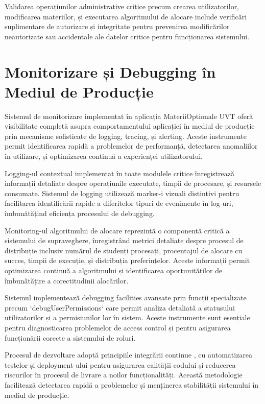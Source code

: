 \documentclass[12pt,a4paper]{report}
\begin{document}
Validarea operațiunilor administrative critice precum crearea utilizatorilor, modificarea materiilor, și executarea algoritmului de alocare include verificări suplimentare de autorizare și integritate pentru prevenirea modificărilor neautorizate sau accidentale ale datelor critice pentru funcționarea sistemului.

\section{Monitorizare și Debugging în Mediul de Producție}

Sistemul de monitorizare implementat în aplicația MateriiOptionale UVT oferă visibilitate completă asupra comportamentului aplicației în mediul de producție prin mecanisme sofisticate de logging, tracing, și alerting. Aceste instrumente permit identificarea rapidă a problemelor de performanță, detectarea anomaliilor în utilizare, și optimizarea continuă a experienței utilizatorului.

Logging-ul contextual implementat în toate modulele critice înregistrează informații detaliate despre operațiunile executate, timpii de procesare, și resursele consumate. Sistemul de logging utilizează marker-i vizuali distintivi pentru facilitarea identificării rapide a diferitelor tipuri de evenimente în log-uri, îmbunătățind eficiența procesului de debugging.

Monitoring-ul algoritmului de alocare reprezintă o componentă critică a sistemului de supraveghere, înregistrând metrici detaliate despre procesul de distribuție inclusiv numărul de studenți procesați, procentajul de alocare cu succes, timpii de execuție, și distribuția preferințelor. Aceste informații permit optimizarea continuă a algoritmului și identificarea oportunităților de îmbunătățire a corectitudinii alocărilor.

Sistemul implementează debugging facilities avansate prin funcții specializate precum `debugUserPermissions` care permit analiza detaliată a statusului utilizatorilor și a permisiunilor lor în sistem. Aceste instrumente sunt esențiale pentru diagnosticarea problemelor de access control și pentru asigurarea funcționării corecte a sistemului de roluri.

Procesul de dezvoltare adoptă principiile integrării continue \cite{continuous-integration}, cu automatizarea testelor și deployment-ului pentru asigurarea calității codului și reducerea riscurilor în procesul de livrare a noilor funcționalități. Această metodologie facilitează detectarea rapidă a problemelor și menținerea stabilității sistemului în mediul de producție.
\end{document}

